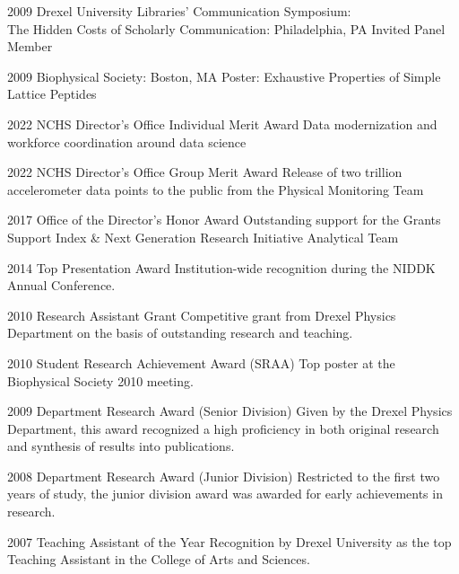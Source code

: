 \documentclass[]{scrartcl}
\begin{document}
\begin{cleanCV}
\WorkExperienceX
{2009}
{Drexel University Libraries' Communication Symposium:\\The Hidden Costs of Scholarly Communication: Philadelphia, PA}
{Invited Panel Member}

\WorkExperienceX
{2009}
{Biophysical Society: Boston, MA}
{Poster: Exhaustive Properties of Simple Lattice Peptides}





\WorkExperienceX
{2022}
{NCHS Director's Office Individual Merit Award}
{Data modernization and workforce coordination around data science}

\WorkExperienceX
{2022}
{NCHS Director's Office Group Merit Award}
{Release of two trillion accelerometer data points to the public from the Physical Monitoring Team}

\WorkExperienceX
{2017}
{Office of the Director's Honor Award}
{Outstanding support for the Grants Support Index \& Next Generation Research Initiative Analytical Team}

\WorkExperienceX
{2014}
{Top Presentation Award}
{Institution-wide recognition during the NIDDK Annual Conference.}

\WorkExperienceX
{2010}
{Research Assistant Grant}
{Competitive grant from Drexel Physics Department on the basis of outstanding research and teaching.}

\WorkExperienceX
{2010}
{Student Research Achievement Award (SRAA)}
{Top poster at the Biophysical Society 2010 meeting. }

\WorkExperienceX
{2009}
{Department Research Award (Senior Division)}
{Given by the Drexel Physics Department, this award recognized a high proficiency in both original research and synthesis of results into publications.}

\WorkExperienceX
{2008}
{Department Research Award (Junior Division)}
{Restricted to the first two years of study, the junior division award was awarded for early achievements in research.}

\WorkExperienceX
{2007}
{Teaching Assistant of the Year}
{Recognition by Drexel University as the top Teaching Assistant in the College of Arts and Sciences.}






\end{cleanCV}
\end{document}
